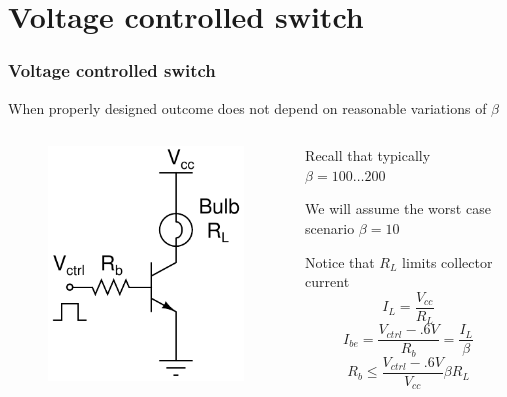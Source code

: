\documentclass[beamer]{standalone}
\begin{document}
\section{Voltage controlled switch}	
\begin{frame}
\frametitle{Voltage controlled switch}
	When properly designed outcome does not depend on reasonable variations
	of $\beta$
	\begin{columns}[c]
		\begin{column}{.3\textwidth}
			\begin{figure}
				\includegraphics[height=0.40\textheight]{./schematics/npn_switch.pdf}
			\end{figure}

		\end{column}
		\begin{column}{.70\textwidth}
			Recall that typically $\beta = 100 \ldots 200$

			We will assume the worst case scenario \alert{$\beta=10$}

			Notice that $R_L$ limits collector current
			\[ I_L = \frac{V_{cc}}{R_L} \]
			\begin{equation*}
				I_{be} = \frac{V_{ctrl}-.6V}{R_{b}} =  \frac{I_L}{\beta} 
			\end{equation*}
			\begin{equation*}
				R_b \le \frac{V_{ctrl}-.6V} {V_{cc}} \beta R_L
			\end{equation*}

		\end{column}
	\end{columns}
\end{frame}
	
\end{document}
